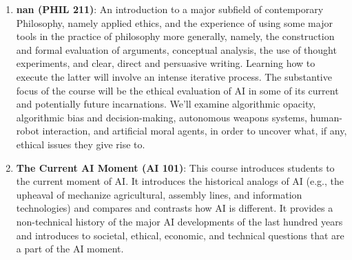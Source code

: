 \begin{enumerate}
\item \textbf{nan (PHIL 211)}: An introduction to a major subfield of contemporary Philosophy, namely applied ethics, and the experience of using some major tools in the practice of philosophy more generally, namely, the construction and formal evaluation of arguments, conceptual analysis, the use of thought experiments, and clear, direct and persuasive writing. Learning how to execute the latter will involve an intense iterative process.
The substantive focus of the course will be the ethical evaluation of AI in some of its current and potentially future incarnations. We’ll examine algorithmic opacity, algorithmic bias
and decision-making, autonomous weapons systems, human-robot interaction, and artificial
moral agents, in order to uncover what, if any, ethical issues they give rise to.
\item \textbf{The Current AI Moment (AI 101)}: This course introduces students to the current moment of AI.  It introduces the historical analogs of AI (e.g., the upheaval of mechanize agricultural, assembly lines, and information technologies) and compares and contrasts how AI is different.  It provides a non-technical history of the major AI developments of the last hundred years and introduces to societal, ethical, economic, and technical questions that are a part of the AI moment.
\end{enumerate}